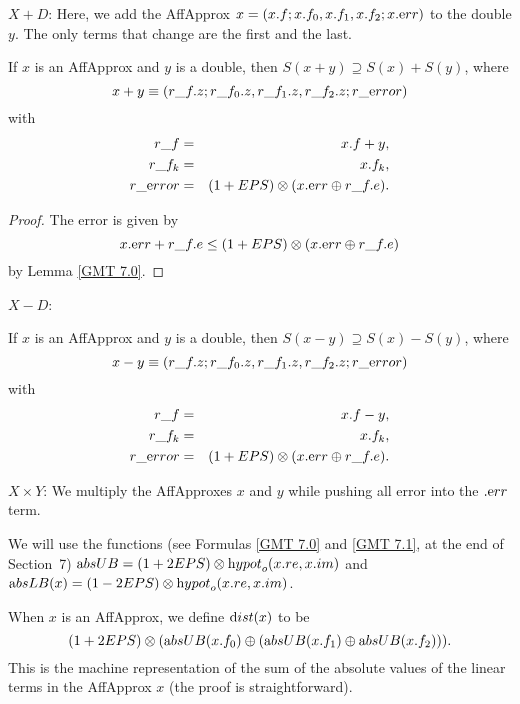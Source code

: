 $X + D$: 
Here, we add the AffApprox $x = (x.f; x.f_0,x.f_1,x.f_2; x.{\textrm err})$  to the double $y$.  The only terms that change are the first and the last.

\begin{proposition}\label{GMT 8.4}\hskip-8pt If $x$ is an 
{\textrm AffApprox}  and $y$ is a double{\textrm ,} 
then $S(x + y) \supseteq S(x) + S(y)${\textrm ,} where
$$x + y \equiv (r\_f.z; r\_f_0.z, r\_f_1.z, r\_f_2.z; r\_{\textrm error})$$
with
\begin{eqnarray*}
r\_f& =& x.f + y,\\
r\_f_k &=& x.f_k,\\
r\_{\textrm error}& = &(1 + EPS) \otimes (x.{\textrm err} \oplus r\_f.e).\end{eqnarray*}
\end{proposition}

\begin{proof}{}
The error is given by 
$$x.{\textrm err} + r\_f.e \le (1 + EPS) \otimes (x.{\textrm err} \oplus r\_f.e)$$
by Lemma \ref{GMT 7.0}. \end{proof}

$X - D$:
\begin{proposition}\label{GMT 8.5}\hskip-8pt If $x$ is an 
{\textrm AffApprox}  and $y$ is a double{\textrm ,}
then $S(x - y) \supseteq S(x) - S(y)${\textrm ,} where
$$x - y \equiv (r\_f.z; r\_f_0.z, r\_f_1.z, r\_f_2.z; r\_{\textrm error})$$
with
\begin{eqnarray*}
r\_f &= &x.f - y,\\
r\_f_k &=& x.f_k,\\
r\_{\textrm error}& =& (1 + EPS) \otimes (x.{\textrm err} \oplus r\_f.e).\end{eqnarray*}
\end{proposition}

$X \times Y$: 
We multiply the AffApproxes $x$ and $y$ while pushing all error into the $.{\textrm err}$ term.

We will use the functions (see Formulas \ref{GMT 7.0} and \ref{GMT 7.1}, at the end of Section~7) ${\textrm absUB}= (1 + 2EPS) \otimes
{\textrm hypot}_o(x.re,x.im)$ and 
${\textrm absLB}(x) = (1 - 2EPS) \otimes {\textrm hypot}_o(x.re,x.im)$.

When $x$ is an AffApprox, we define ${\textrm dist}(x)$ to be $$(1 + 2EPS) \otimes ({\textrm absUB}(x.f_0) \oplus ({\textrm absUB}(x.f_1) \oplus {\textrm absUB}(x.f_2))).$$  This is the machine representation of the sum of the absolute values of the linear terms in the AffApprox $x$ 
(the proof is straightforward).

